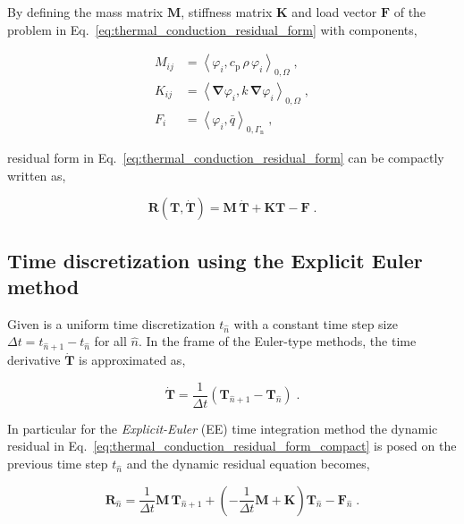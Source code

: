 \documentclass[10pt,a4paper]{article}
\begin{document}
By defining the mass matrix $\mathbf{M}$, stiffness matrix $\mathbf{K}$ and load vector $\mathbf{F}$ of the problem in Eq.~\eqref{eq:thermal_conduction_residual_form} with components,

\begin{subequations}
	\begin{alignat}{1}
		M_{ij} &= \left< \varphi_i , c_{\text{p}} \, \rho \, \varphi_i \right>_{0,\Omega} \;, \label{eq:massMtx} \\
		K_{ij} &= \left< \boldsymbol{\nabla} \varphi_i , k \, \boldsymbol{\nabla} \varphi_i \right>_{0,\Omega} \;, \label{eq:stiffMtx} \\
		F_i &= \left< \varphi_i , \bar{q} \right>_{0, \Gamma_{\text{n}}} \;, \label{eq:forceVct}
	\end{alignat}
	\label{eq:discrete_matrices}
\end{subequations}

residual form in Eq.~\eqref{eq:thermal_conduction_residual_form} can be compactly written as,

\begin{equation}
\mathbf{R}(\mathbf{T}, \dot{\mathbf{T}}) = \mathbf{M} \, \dot{\mathbf{T}} + \mathbf{K} \mathbf{T} - \mathbf{F} \;. \label{eq:thermal_conduction_residual_form_compact}
\end{equation}

\subsection{Time discretization using the Explicit Euler method}\label{subsec:time_discretization_ee}

Given is a uniform time discretization $t_{\hat{n}}$ with a constant time step size $\Delta t = t_{\hat{n} + 1} - t_{\hat{n}}$ for all $\hat{n}$. In the frame of the Euler-type methods, the time derivative $\dot{\mathbf{T}}$ is approximated as,

\begin{equation}
	\dot{\mathbf{T}} = \frac{1}{\Delta t} \left( \mathbf{T}_{\hat{n} + 1} - \mathbf{T}_{\hat{n}} \right) \;. \label{eq:timeDeriv_euler}
\end{equation}

In particular for the \textit{Explicit-Euler} (EE) time integration method the dynamic residual in Eq.~\eqref{eq:thermal_conduction_residual_form_compact} is posed on the previous time step $t_{\hat{n}}$ and the dynamic residual equation becomes,

\begin{equation}
	\mathbf{R}_{\hat{n}} = \frac{1}{\Delta t} \mathbf{M} \, \mathbf{T}_{\hat{n} + 1} + \left( - \frac{1}{\Delta t} \mathbf{M} + \mathbf{K} \right) \mathbf{T}_{\hat{n}} - \mathbf{F}_{\hat{n}} \;. \label{eq:dynamic_residual_ee}
\end{equation}
\end{document}
